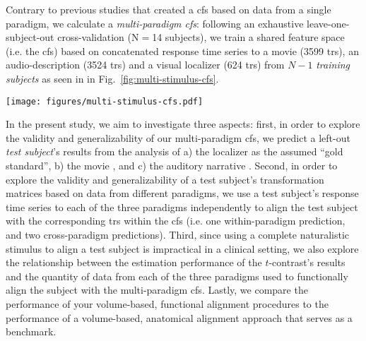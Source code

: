 Contrary to previous studies \citep[e.g.][]{jiahui2020predicting,
guntupalli2016model, haxby2011common} that created a \ac{cfs} based on data from
a single paradigm, we calculate a \textit{multi-paradigm \ac{cfs}}:
following an exhaustive leave-one-subject-out cross-validation (N$=$14
subjects), we train a shared feature space (i.e. the \ac{cfs}) based on
concatenated response time series to a movie (3599 \acp{tr}), an
audio-description (3524 \acp{tr}) and a visual localizer (624 \acp{tr}) from
$N-1$ \textit{training subjects} as seen in in
Fig.~\ref{fig:multi-stimulus-cfs}.



\begin{figure*}[tbp]
\centering
    \texttt{[image: figures/multi-stimulus-cfs.pdf]}
    \caption{
    \textbf{Overview of the shared response model.
    }
    For each fold of the leave-one-subject-out cross-validation, each training
    subject's response time series from the movie (3599 \acp{tr}), the movie's
    audio-description (3524 \acp{tr}), and the visual localizer (624 \acp{tr})
    were concatenated to serve as input for the \ac{srm} algorithm.
    From these response time series represented as matrix $X_{n}$ ({$v$} voxels
    by $t$ time points), the algorithm calculates the common functional
    space (CFS) $C$ ($k$ shared features by $t$ time points) and
    subject-specific, transformation matrices $W_{n}$
    ($v$ voxels by $k$ shared features) with orthonormal columns
    ($W_{n}^{T}W_{n}=I_{k}$).
} \label{fig:multi-stimulus-cfs} \end{figure*}


In the present study, we aim to investigate three aspects:
first, in order to explore the validity and generalizability of our
multi-paradigm \ac{cfs}, we predict a left-out \textit{test subject}'s results
from the analysis of
%
a) the localizer \citep{sengupta2016extension} as the assumed ``gold standard'',
%
b) the movie \citep{haeusler2022processing}, and
%
c) the auditory narrative \citep{haeusler2022processing}.
Second, in order to explore the validity and generalizability of a test
subject's transformation matrices based on data from different paradigms, we use
a test subject's response time series to each of the three paradigms
independently to align the test subject with the corresponding \acp{tr} within
the \ac{cfs} (i.e. one within-paradigm prediction, and two cross-paradigm
predictions).
Third, since using a complete naturalistic stimulus to align a test subject is
impractical in a clinical setting, we also explore the relationship between the
estimation performance of the $t$-contrast's results and the quantity of data
from each of the three paradigms used to functionally align the subject with the
multi-paradigm \ac{cfs}.
Lastly, we compare the performance of your volume-based, functional alignment
procedures to the performance of a volume-based, anatomical alignment approach
that serves as a benchmark.



